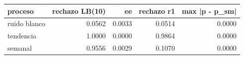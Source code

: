 \begin{tabular}{lrrrr}
\toprule
proceso & rechazo LB(10) & ee & rechazo r1 & max |p - p\_sm| \\
\midrule
ruido blanco & 0.0562 & 0.0033 & 0.0514 & 0.0000 \\
tendencia & 1.0000 & 0.0000 & 0.9864 & 0.0000 \\
semanal & 0.9556 & 0.0029 & 0.1070 & 0.0000 \\
\bottomrule
\end{tabular}
